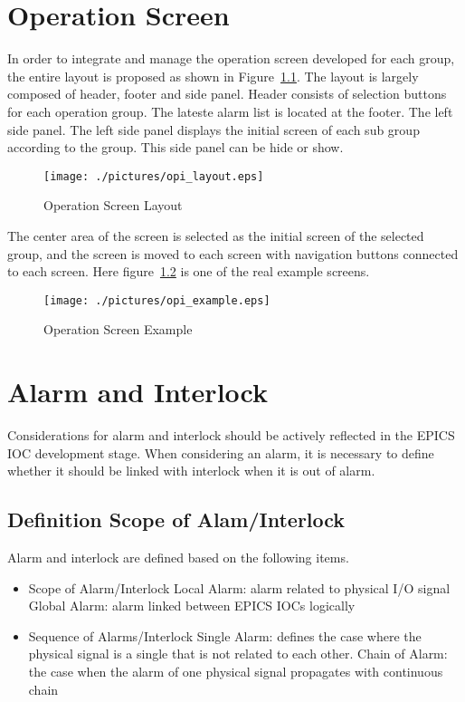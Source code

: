 \documentclass[11pt
  , letterpaper
  , article
  , oneside
  , showtrims
]{memoir}
\begin{document}
\chapter{Operation Screen}
In order to integrate and manage the operation screen developed for each group, the entire layout is proposed as shown in Figure~\ref{fig:opi_layout}. The layout is largely composed of header, footer and side panel. Header consists of selection buttons for each operation group. The lateste alarm list is located at the footer. The left side panel. The left side panel displays the initial screen of each sub group according to the group. This side panel can be hide or show. 
\newpage
\begin{figure}[!hbt]
	\centering
	\texttt{[image: ./pictures/opi\_layout.eps]}
	\caption{
		Operation Screen Layout
	}
	\label{fig:opi_layout}   
\end{figure}
The center area of the screen is selected as the initial screen of the selected group, and the screen is moved to each screen with navigation buttons connected to each screen.
Here figure~\ref{fig:opi_example} is one of the real example screens. 

\begin{figure}[!hbt]
	\centering
	\texttt{[image: ./pictures/opi\_example.eps]}
	\caption{
		Operation Screen Example
	}
	\label{fig:opi_example}   
\end{figure}

\newpage
\chapter{Alarm and Interlock}
Considerations for alarm and interlock should be actively reflected in the EPICS IOC development stage. When considering an alarm, it is necessary to define whether it should be linked with interlock when it is out of alarm. 

\section{Definition Scope of Alam/Interlock}
Alarm and interlock are defined based on the following items.

\begin{itemize}
	\item Scope of Alarm/Interlock
	\subitem Local Alarm: alarm related to physical I/O signal
	\subitem Global Alarm: alarm linked between EPICS IOCs logically
	\item Sequence of Alarms/Interlock
	\subitem Single Alarm: defines the case where the physical signal is a single that is not related to each other.
	\subitem Chain of Alarm: the case when the alarm of one physical signal propagates with continuous chain
\end{itemize}
\end{document}
